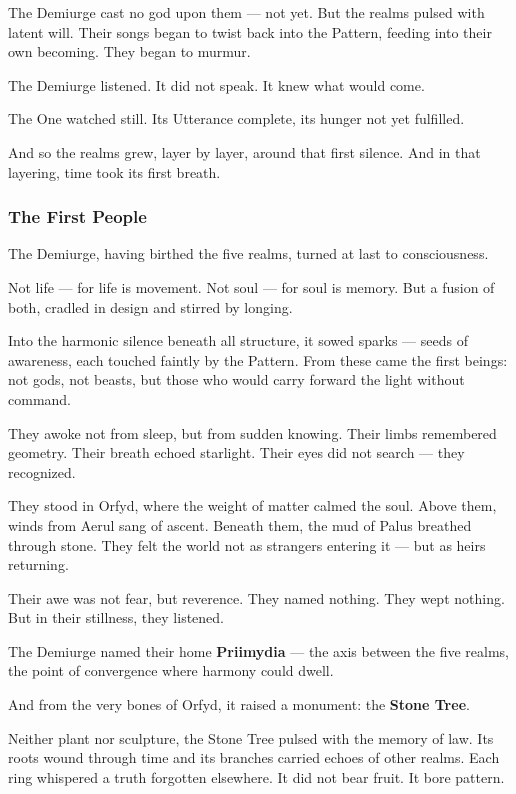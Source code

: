 \documentclass[12pt]{article}
\begin{document}
The Demiurge cast no god upon them — not yet.  
But the realms pulsed with latent will.  
Their songs began to twist back into the Pattern, feeding into their own becoming.  
They began to murmur.

The Demiurge listened. It did not speak.  
It knew what would come.

The One watched still.  
Its Utterance complete, its hunger not yet fulfilled.

And so the realms grew, layer by layer, around that first silence.  
And in that layering, time took its first breath.

\dotfill

\subsubsection*{The First People}

The Demiurge, having birthed the five realms, turned at last to consciousness.

Not life — for life is movement.  
Not soul — for soul is memory.  
But a fusion of both, cradled in design and stirred by longing.

Into the harmonic silence beneath all structure, it sowed sparks — seeds of awareness, each touched faintly by the Pattern.  
From these came the first beings: not gods, not beasts, but those who would carry forward the light without command.

They awoke not from sleep, but from sudden knowing.  
Their limbs remembered geometry.  
Their breath echoed starlight.  
Their eyes did not search — they recognized.

They stood in Orfyd, where the weight of matter calmed the soul.  
Above them, winds from Aerul sang of ascent. Beneath them, the mud of Palus breathed through stone.  
They felt the world not as strangers entering it — but as heirs returning.

Their awe was not fear, but reverence.  
They named nothing. They wept nothing. But in their stillness, they listened.

The Demiurge named their home \textbf{Priimydia} — the axis between the five realms, the point of convergence where harmony could dwell.

And from the very bones of Orfyd, it raised a monument:  
the \textbf{Stone Tree}.

Neither plant nor sculpture, the Stone Tree pulsed with the memory of law.  
Its roots wound through time and its branches carried echoes of other realms.  
Each ring whispered a truth forgotten elsewhere.  
It did not bear fruit. It bore pattern.
\end{document}
